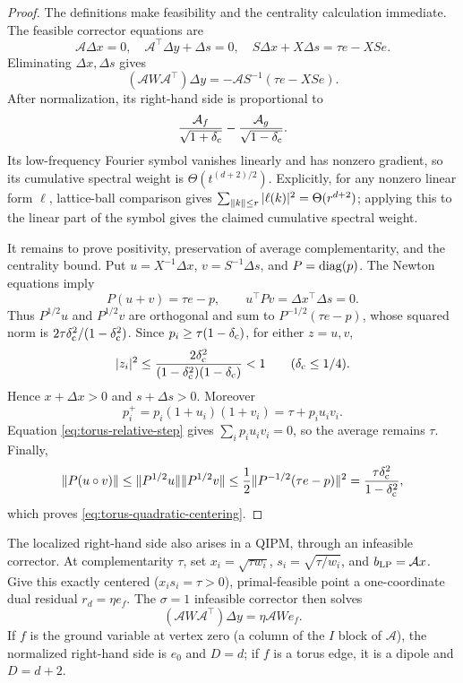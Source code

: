 \begin{proof}
The definitions make feasibility and the centrality calculation immediate.
The feasible corrector equations are
\[
 \mathcal A\Delta x=0,
 \quad \mathcal A^\top\Delta y+\Delta s=0,
 \quad S\Delta x+X\Delta s=\tau e-XSe.
\]
Eliminating $\Delta x,\Delta s$ gives
\begin{equation}
 (\mathcal AW\mathcal A^\top)\Delta y
 =-\mathcal AS^{-1}(\tau e-XSe).
 \label{eq:torus-corrector-normal}
\end{equation}
After normalization, its right-hand side is proportional to
\[
 \frac{\mathcal A_f}{\sqrt{1+\delta_{\rm c}}}
 -\frac{\mathcal A_g}{\sqrt{1-\delta_{\rm c}}}.
\]
Its low-frequency Fourier symbol vanishes linearly and has nonzero gradient,
so its cumulative spectral weight is $\Theta(t^{(d+2)/2})$.  Explicitly, for
any nonzero linear form $\ell$, lattice-ball comparison gives
$\sum_{\lVert k\rVert\leq r}|\ell(k)|^2=\Theta(r^{d+2})$; applying this to the
linear part of the symbol gives the claimed cumulative spectral weight.

It remains to prove positivity, preservation of average complementarity,
and the centrality bound.  Put
$u=X^{-1}\Delta x$, $v=S^{-1}\Delta s$, and
$P=\operatorname{diag}(p)$.  The Newton
equations imply
\begin{equation}
 P(u+v)=\tau e-p,\qquad
 u^\top Pv=\Delta x^\top\Delta s=0.
 \label{eq:torus-relative-step}
\end{equation}
Thus $P^{1/2}u$ and $P^{1/2}v$ are orthogonal and sum to
$P^{-1/2}(\tau e-p)$, whose squared norm is
$2\tau\delta_{\rm c}^2/(1-\delta_{\rm c}^2)$.  Since
$p_i\geq\tau(1-\delta_{\rm c})$, for either $z=u,v$,
\[
 |z_i|^2\leq
 \frac{2\delta_{\rm c}^2}
 {(1-\delta_{\rm c}^2)(1-\delta_{\rm c})}<1
 \qquad(\delta_{\rm c}\leq1/4).
\]
Hence $x+\Delta x>0$ and $s+\Delta s>0$.  Moreover
\[
 p_i^+=p_i(1+u_i)(1+v_i)=\tau+p_i u_iv_i.
\]
Equation \eqref{eq:torus-relative-step} gives
$\sum_i p_iu_iv_i=0$, so the average remains $\tau$.  Finally,
\[
 \lVert P(u\circ v)\rVert
 \leq\lVert P^{1/2}u\rVert\lVert P^{1/2}v\rVert
 \leq\frac12\lVert P^{-1/2}(\tau e-p)\rVert^2
 =\frac{\tau\delta_{\rm c}^2}{1-\delta_{\rm c}^2},
\]
which proves \eqref{eq:torus-quadratic-centering}.
\end{proof}

The localized right-hand side also arises in a QIPM, through an infeasible
corrector.  At complementarity $\tau$, set
$x_i=\sqrt{\tau w_i}$, $s_i=\sqrt{\tau/w_i}$, and
$b_{\rm LP}=\mathcal Ax$.  Give this exactly centered
($x_is_i=\tau>0$), primal-feasible point a one-coordinate dual residual
$r_d=\eta e_f$.  The $\sigma=1$ infeasible corrector then solves
\begin{equation}
 (\mathcal AW\mathcal A^\top)\Delta y=\eta\mathcal AWe_f.
 \label{eq:torus-infeasible-corrector}
\end{equation}
If $f$ is the ground variable at vertex zero (a column of the $I$ block of
$\mathcal A$), the normalized right-hand side is $e_0$ and $D=d$; if $f$ is a
torus edge, it is a dipole and $D=d+2$.

